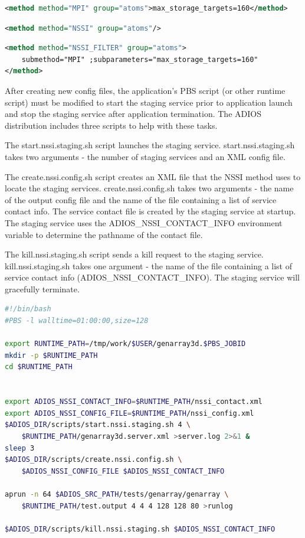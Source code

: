 \begin{lstlisting}[language=XML, caption=Example Original Client XML]
<method method="MPI" group="atoms">max_storage_targets=160</method>
\end{lstlisting}

\begin{lstlisting}[language=XML, caption=Example NSSI Client XML]
<method method="NSSI" group="atoms"/>
\end{lstlisting}

\begin{lstlisting}[language=XML, caption=Example NSSI Staging Service XML]
<method method="NSSI_FILTER" group="atoms"> 
	submethod="MPI" ;subparameters="max_storage_targets=160"
</method>
\end{lstlisting}

After creating new config files, the application's PBS script (or other runtime 
script) must be modified to start the staging service prior to application launch 
and stop the staging service after application termination. The ADIOS distribution 
includes three scripts to help with these tasks.

The start.nssi.staging.sh script launches the staging service.  start.nssi.staging.sh 
takes two arguments - the number of staging services and an XML config file.

The create.nssi.config.sh script creates an XML file that the NSSI method uses 
to locate the staging services.  create.nssi.config.sh takes two arguments - the 
name of the output config file and the name of the file containing a list of service 
contact info.  The service contact file is created by the staging service at startup. 
 The staging service uses the ADIOS\_NSSI\_CONTACT\_INFO environment variable to 
determine the pathname of the contact file.

The kill.nssi.staging.sh script sends a kill request to the staging service.  kill.nssi.staging.sh 
 takes one argument - the name of the file containing a list of service contact 
info (ADIOS\_NSSI\_CONTACT\_INFO).  The staging service will gracefully terminate.

\begin{lstlisting}[language=bash, caption={Example PBS script with NSSI Staging Service}, label=list-nssi-pbs-script]
#!/bin/bash
#PBS -l walltime=01:00:00,size=128

export RUNTIME_PATH=/tmp/work/$USER/genarray3d.$PBS_JOBID
mkdir -p $RUNTIME_PATH
cd $RUNTIME_PATH


export ADIOS_NSSI_CONTACT_INFO=$RUNTIME_PATH/nssi_contact.xml
export ADIOS_NSSI_CONFIG_FILE=$RUNTIME_PATH/nssi_config.xml 
$ADIOS_DIR/scripts/start.nssi.staging.sh 4 \
	$RUNTIME_PATH/genarray3d.server.xml >server.log 2>&1 &
sleep 3
$ADIOS_DIR/scripts/create.nssi.config.sh \
	$ADIOS_NSSI_CONFIG_FILE $ADIOS_NSSI_CONTACT_INFO 

aprun -n 64 $ADIOS_SRC_PATH/tests/genarray/genarray \
	$RUNTIME_PATH/test.output 4 4 4 128 128 80 >runlog 

$ADIOS_DIR/scripts/kill.nssi.staging.sh $ADIOS_NSSI_CONTACT_INFO
\end{lstlisting}

